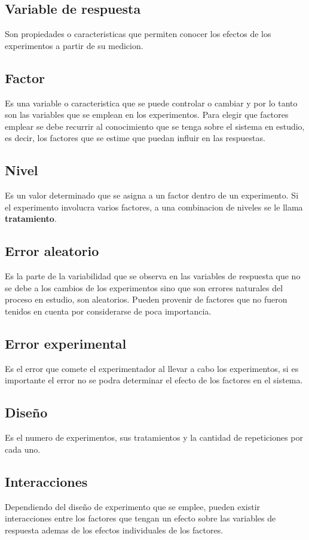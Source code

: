 \documentclass[a4paper]{article}
\begin{document}
\subsection*{Variable de respuesta}
Son propiedades o caracteristicas que permiten conocer los efectos de los experimentos a partir de su medicion.

\subsection*{Factor}
Es una variable o caracteristica que se puede controlar o cambiar y por lo tanto son las variables que se emplean 
en los experimentos. Para elegir que factores emplear se debe recurrir al conocimiento que se tenga sobre el 
sistema en estudio, es decir, los factores que se estime que puedan influir en las respuestas.

\subsection*{Nivel}
Es un valor determinado que se asigna a un factor dentro de un experimento. Si el experimento involucra varios factores,
a una combinacion de niveles se le llama \textbf{tratamiento}.

\subsection*{Error aleatorio}
Es la parte de la variabilidad que se observa en las variables de respuesta que no se debe a los cambios de los 
experimentos sino que son errores naturales del proceso en estudio, son aleatorios. Pueden provenir de factores
que no fueron tenidos en cuenta por considerarse de poca importancia.

\subsection*{Error experimental}
Es el error que comete el experimentador al llevar a cabo los experimentos, si es importante el error no se podra
determinar el efecto de los factores en el sistema.

\subsection*{Diseño}
Es el numero de experimentos, sus tratamientos y la cantidad de repeticiones por cada uno.

\subsection*{Interacciones}
Dependiendo del diseño de experimento que se emplee, pueden existir interacciones entre los factores que tengan 
un efecto sobre las variables de respuesta ademas de los efectos individuales de los factores.
\end{document}
